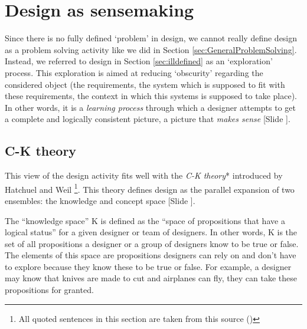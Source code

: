 \documentclass{article}
\newcounter{slide}
\begin{document}
\section{Design as sensemaking}
\label{sec:sensemaking}
Since there is no fully defined `problem' in design, we cannot really define design as a problem solving activity like we did in Section \ref{sec:GeneralProblemSolving}. Instead, we referred to design in Section \ref{sec:illdefined} as an `exploration' process. This exploration is aimed at reducing `obscurity' regarding the considered object (the requirements, the system which is supposed to fit with these requirements, the context in which this systems is supposed to take place). In other words, it is a \emph{learning process} through which a designer attempts to get a complete and logically consistent picture, a picture that \emph{makes sense} {\color{blue}[Slide ]}. 


\subsection{C-K theory}
\label{sec:CK}
This view of the design activity fits well with the \emph{C-K theory}* introduced by Hatchuel and Weil \cite{hatchuel2003new}\footnote{All quoted sentences in this section are taken from this source (\cite{hatchuel2003new})}. This theory defines design as the parallel expansion of two ensembles: the knowledge and concept space {\color{blue}[Slide ]}. 

The ``knowledge space'' K is defined as the ``space of propositions that have a logical status'' for a given designer or team of designers. In other words, K is the set of all propositions a designer or a group of designers know to be true or false. The elements of this space are propositions designers can rely on and don't have to explore because they know these to be true or false. For example, a designer may know that knives are made to cut and airplanes can fly, they can take these propositions for granted. 
\end{document}
